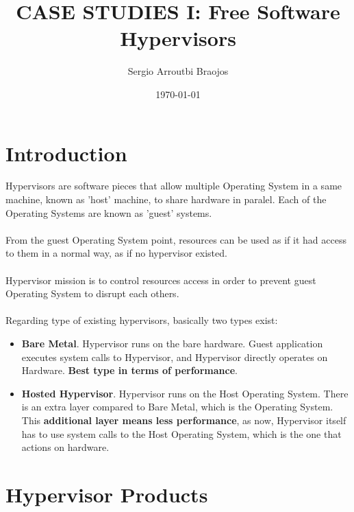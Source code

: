 \documentclass[11pt]{article}
\title{\textbf{CASE STUDIES I: Free Software Hypervisors}}
\author{Sergio Arroutbi Braojos}
\date{\today}
\begin{document}
\maketitle

\section{Introduction}
Hypervisors are software pieces that allow multiple Operating System in a same machine, known as 'host' machine, to share hardware in paralel. Each of the Operating Systems are known as 'guest' systems.\\
\\
From the guest Operating System point, resources can be used as if it had access to them in a normal way, as if no hypervisor existed.\\
\\
Hypervisor mission is to control resources access in order to prevent guest Operating System to disrupt each others.\\
\\
Regarding type of existing hypervisors, basically two types exist:
\begin{itemize}
\item{\textbf{Bare Metal}}. Hypervisor runs on the bare hardware. Guest application executes system calls to Hypervisor, and Hypervisor directly operates on Hardware. \textbf{Best type in terms of performance}.
\item{\textbf{Hosted Hypervisor}}. Hypervisor runs on the Host Operating System. There is an extra layer compared to Bare Metal, which is the Operating System. This \textbf{additional layer means less performance}, as now, Hypervisor itself has to use system calls to the Host Operating System, which is the one that actions on hardware.
\end{itemize}

\section{Hypervisor Products}
\end{document}
